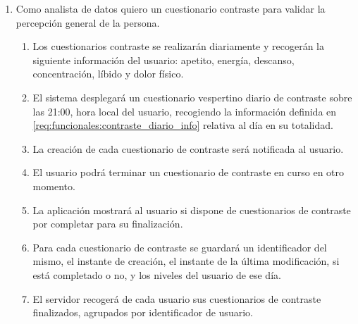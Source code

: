         \begin{enumerate}[resume=req-usuario,label=\textbf{\texttt{RU-\arabic*}}]
            \item \label{req:usuario:analista_contraste} Como analista de datos quiero un cuestionario contraste para validar la percepción general de la persona.
            \begin{enumerate}[resume=req-funcionales,label=\textbf{\texttt{RF-\arabic*}}]
                \item \label{req:funcionales:contraste_diario_info} Los cuestionarios contraste se realizarán diariamente y recogerán la siguiente información del usuario: apetito, energía, descanso, concentración, líbido y dolor físico. 
                \item \label{req:funcionales:contraste_diario_noche} El sistema desplegará un cuestionario vespertino diario de contraste sobre las 21:00, hora local del usuario, recogiendo la información definida en \ref{req:funcionales:contraste_diario_info} relativa al día en su totalidad.
                \item \label{req:funcionales:contraste_notificacion} La creación de cada cuestionario de contraste será notificada al usuario.
                \item \label{req:funcionales:contraste_cuestionario_aplazar} El usuario podrá terminar un cuestionario de contraste en curso en otro momento.
                \item \label{req:funcionales:contraste_cuestionario_pendientes} La aplicación mostrará al usuario si dispone de cuestionarios de contraste por completar para su finalización.
                \item \label{req:funcionales:contraste_diario_formato} Para cada cuestionario de contraste se guardará un identificador del mismo, el instante de creación, el instante de la última modificación, si está completado o no, y los niveles del usuario de ese día.
                \item \label{req:funcionales:contraste_finalizado_servidor} El servidor recogerá de cada usuario sus cuestionarios de contraste finalizados, agrupados por identificador de usuario.
            \end{enumerate}
        \end{enumerate}

